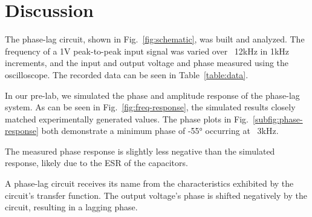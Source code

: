 \clearpage		%
\section{Discussion}\label{sec:discussion}
The phase-lag circuit, shown in Fig.~\ref{fig:schematic}, was built and analyzed.
The frequency of a 1V peak-to-peak input signal was varied over ~12kHz in 1kHz increments, and the input and output voltage and phase measured using the oscilloscope.
The recorded data can be seen in Table~\ref{table:data}.

In our pre-lab, we simulated the phase and amplitude response of the phase-lag system.
As can be seen in Fig.~\ref{fig:freq-response}, the simulated results closely matched experimentally generated values.
The phase plots in Fig.~\ref{subfig:phase-response} both demonstrate a minimum phase of -55\si{\degree} occurring at ~3kHz.

The measured phase response is slightly less negative than the simulated response, likely due to the ESR of the capacitors.

A phase-lag circuit receives its name from the characteristics exhibited by the circuit's transfer function.
The output voltage's phase is shifted negatively by the circuit, resulting in a lagging phase.
